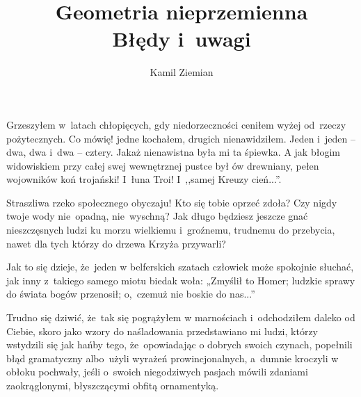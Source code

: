 \documentclass[a4paper,11pt]{article}
\title{Geometria nieprzemienna \\
  Błędy i~uwagi}
\author{Kamil Ziemian}
\begin{document}





\maketitle %




\noindent
Grzeszyłem w~latach chłopięcych, gdy niedorzeczności ceniłem
wyżej od~rzeczy pożytecznych. Co mówię! jedne kochałem, drugich
nienawidziłem. Jeden i~jeden -- dwa, dwa i~dwa -- cztery. Jakaż
nienawistna była mi ta śpiewka. A jak błogim widowiskiem przy całej
swej wewnętrznej pustce był ów drewniany, pełen wojowników koń
trojański! I~łuna Troi! I~,,samej Kreuzy cień...''.


\vspace{\spaceThree}



\noindent
Straszliwa rzeko społecznego obyczaju! Kto się tobie oprzeć
zdoła? Czy nigdy twoje wody nie~opadną, nie~wyschną? Jak długo
będziesz jeszcze gnać nieszczęsnych ludzi ku morzu wielkiemu
i~groźnemu, trudnemu do przebycia, nawet dla tych którzy do drzewa
Krzyża przywarli?


\vspace{\spaceThree}




\noindent
Jak to się dzieje, że~jeden w belferskich szatach człowiek może
spokojnie słuchać, jak inny z~takiego samego miotu biedak woła:
„Zmyślił to Homer; ludzkie sprawy do świata bogów przenosił;
o,~czemuż nie boskie do nas...”


\vspace{\spaceThree}



\noindent
Trudno się dziwić, że~tak się pogrążyłem w marnościach
i~odchodziłem daleko od Ciebie, skoro jako wzory do naśladowania
przedstawiano mi ludzi, którzy wstydzili się jak hańby tego,
że~opowiadając o dobrych swoich czynach, popełnili błąd gramatyczny
albo~użyli wyrażeń prowincjonalnych, a~dumnie kroczyli w obłoku
pochwały, jeśli o~swoich niegodziwych pasjach mówili zdaniami
zaokrąglonymi, błyszczącymi obfitą ornamentyką.
\end{document}
